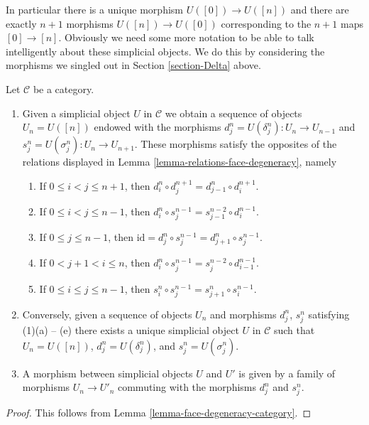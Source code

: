 \medskip\noindent
In particular there is a unique morphism $U([0]) \to U([n])$ and there are
exactly $n + 1$ morphisms $U([n]) \to U([0])$ corresponding to
the $n + 1$ maps $[0] \to [n]$. Obviously we need some more notation
to be able to talk
intelligently about these simplicial objects. We do this by considering
the morphisms we singled out in Section \ref{section-Delta} above.

\begin{lemma}
\label{lemma-characterize-simplicial-object}
Let $\mathcal{C}$ be a category.
\begin{enumerate}
\item Given a simplicial object $U$ in $\mathcal{C}$
we obtain a sequence of objects $U_n = U([n])$ endowed
with the morphisms $d^n_j = U(\delta^n_j) : U_n \to U_{n-1}$ and
$s^n_j = U(\sigma^n_j) : U_n \to U_{n + 1}$. These morphisms
satisfy the opposites of the relations displayed in
Lemma \ref{lemma-relations-face-degeneracy}, namely
\begin{enumerate}
\item If $0 \leq i < j \leq n + 1$, then
$d^n_i \circ d^{n + 1}_j = d^n_{j - 1} \circ d^{n + 1}_i$.
\item If $0 \leq i < j \leq n - 1$, then
$d^n_i \circ s^{n - 1}_j = s^{n - 2}_{j - 1} \circ d^{n - 1}_i$.
\item If $0 \leq j \leq n - 1$, then
$\text{id} = d^n_j \circ s^{n - 1}_j = d^n_{j + 1} \circ s^{n - 1}_j$.
\item If $0 < j + 1 < i \leq n$, then
$d^n_i \circ s^{n - 1}_j = s^{n - 2}_j \circ d^{n - 1}_{i - 1}$.
\item If $0 \leq i \leq j \leq n - 1$, then
$s^n_i \circ s^{n - 1}_j = s^n_{j + 1} \circ s^{n - 1}_i$.
\end{enumerate}
\item Conversely, given a sequence of objects $U_n$ and morphisms
$d^n_j$, $s^n_j$ satisfying (1)(a) -- (e) there exists a unique
simplicial object $U$ in $\mathcal{C}$ such that $U_n = U([n])$,
$d^n_j = U(\delta^n_j)$, and $s^n_j = U(\sigma^n_j)$.
\item A morphism between simplicial objects $U$ and $U'$
is given by a family of morphisms $U_n \to U'_n$ commuting
with the morphisms $d^n_j$ and $s^n_j$.
\end{enumerate}
\end{lemma}

\begin{proof}
This follows from Lemma \ref{lemma-face-degeneracy-category}.
\end{proof}

